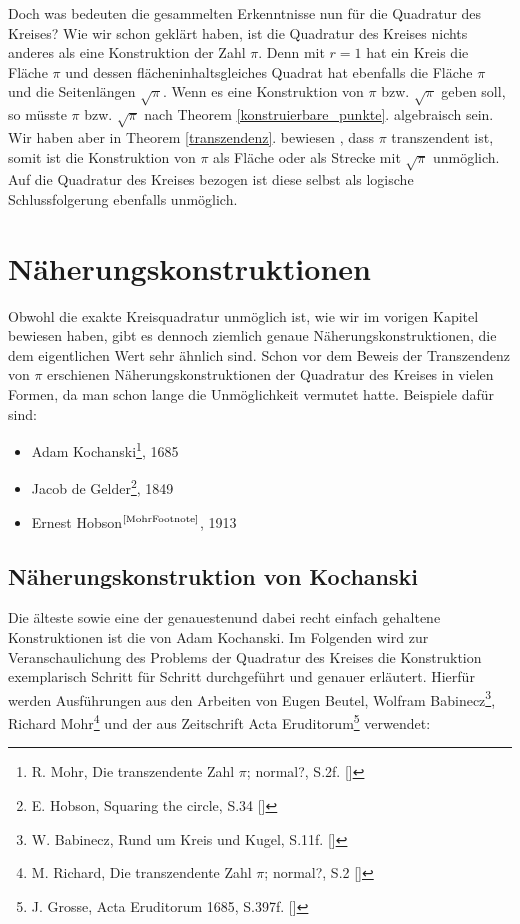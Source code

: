 \documentclass[11pt]{article}
\begin{document}
Doch was bedeuten die gesammelten Erkenntnisse nun für die Quadratur des Kreises? Wie wir schon geklärt haben, ist die Quadratur des Kreises nichts anderes als eine Konstruktion der Zahl $\pi$. Denn mit $r=1$ hat ein Kreis die Fläche $\pi$ und dessen flächeninhaltsgleiches Quadrat hat ebenfalls die Fläche $\pi$ und die Seitenlängen $\sqrt{\pi}$. Wenn es eine Konstruktion von $\pi$ bzw. $\sqrt{\pi}$ geben soll, so müsste $\pi$ bzw. $\sqrt{\pi}$ nach Theorem \ref{konstruierbare_punkte}. algebraisch sein. Wir haben aber in Theorem \ref{transzendenz}. bewiesen , dass $\pi$ transzendent ist, somit ist die Konstruktion von $\pi$ als Fläche oder als Strecke mit $\sqrt{\pi}$ unmöglich. Auf die Quadratur des Kreises bezogen ist diese selbst als logische Schlussfolgerung ebenfalls unmöglich.
\clearpage
\section{Näherungskonstruktionen}
Obwohl die exakte Kreisquadratur unmöglich ist, wie wir im vorigen Kapitel bewiesen haben, gibt es dennoch ziemlich genaue Näherungskonstruktionen, die dem eigentlichen Wert sehr ähnlich sind. Schon vor dem Beweis der Transzendenz von \(\pi\) erschienen Näherungskonstruktionen der Quadratur des Kreises in vielen Formen, da man schon lange die Unmöglichkeit vermutet hatte. Beispiele dafür sind:
\begin{itemize}
  \item Adam Kochanski\footnote{\label{MohrFootnote}R. Mohr, Die transzendente Zahl \(\pi\); normal?, S.2f. [\MohrInt]}, 1685
  \item Jacob de Gelder\footnote{E. Hobson, Squaring the circle, S.34 [\HobsonInt]}, 1849 
  \item Ernest Hobson$^\text{\ref{MohrFootnote}}$, 1913
\end{itemize}
\subsection{Näherungskonstruktion von Kochanski}\label{kochanski_section}
Die älteste sowie eine der genauesten\footnotemark und dabei recht einfach gehaltene Konstruktionen ist die von Adam Kochanski. Im Folgenden wird zur Veranschaulichung des Problems der Quadratur des Kreises die Konstruktion exemplarisch Schritt für Schritt durchgeführt und genauer erläutert. Hierfür werden Ausführungen aus den Arbeiten von Eugen Beutel\footnotemark[\value{footnote}] , Wolfram Babinecz\footnote{W. Babinecz, Rund um Kreis und Kugel, S.11f. [\BabineczInt]}, Richard Mohr\footnote{M. Richard, Die transzendente Zahl \(\pi\); normal?, S.2 [\MohrInt]} und der aus Zeitschrift Acta Eruditorum\footnote{J. Grosse, Acta Eruditorum 1685, S.397f. [\ActaInt]} verwendet: \newline\newline
\end{document}
